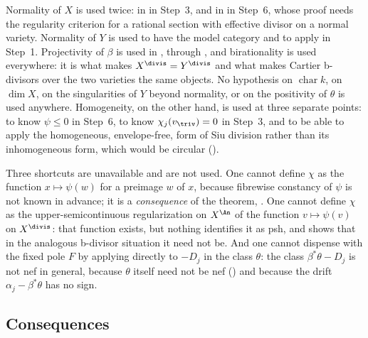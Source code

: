 \begin{remark}
\label{rem:ch39-hypothesis-map}
Normality of $X$ is used twice: in
 in Step~3, and in
 in Step~6, whose proof needs the
regularity criterion for a rational section with effective divisor on a
normal variety.  Normality of $Y$ is used to have the model category and
to apply  in Step~1.  Projectivity
of $\beta$ is used in , through
, and birationality is used
everywhere: it is what makes $X^{\divis}=Y^{\divis}$ and what makes
Cartier b-divisors over the two varieties the same objects.  No hypothesis
on $\operatorname{char}k$, on $\dim X$, on the singularities of $Y$
beyond normality, or on the positivity of $\theta$ is used anywhere.
Homogeneity, on the other hand, is used at three separate points: to know
$\psi\le0$ in Step~6, to know $\chi_j(v_{\triv})=0$ in Step~3, and to be
able to apply the homogeneous, envelope-free, form of Siu division rather
than its inhomogeneous form, which would be circular
().
\end{remark}

\begin{remark}
\label{rem:ch39-proof-negative}
Three shortcuts are unavailable and are not used.  One cannot define
$\chi$ as the function $x\mapsto\psi(w)$ for a preimage $w$ of $x$,
because fibrewise constancy of $\psi$ is not known in advance; it is a
\emph{consequence} of the theorem, .  One
cannot define $\chi$ as the upper-semicontinuous regularization on
$X^{\An}$ of the function $v\mapsto\psi(v)$ on $X^{\divis}$: that
function exists, but nothing identifies it as psh, and
 shows that in the analogous b-divisor situation
it need not be.  And one cannot dispense with the fixed pole $F$ by
applying  directly to $-D_j$ in the
class $\theta$: the class $\beta^*\theta-D_j$ is not nef in general,
because $\theta$ itself need not be nef
() and because the drift
$\alpha_j-\beta^*\theta$ has no sign.
\end{remark}

\subsection{Consequences}
\label{sec:ch39-homogeneous-consequences}

